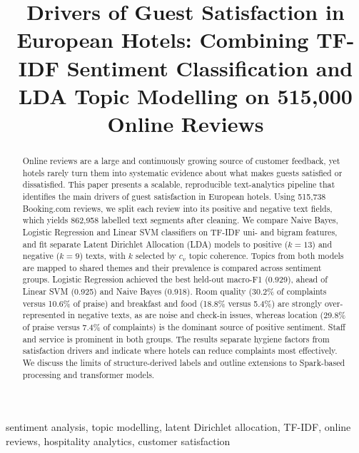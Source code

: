\documentclass[11pt,journal,draftclsnofoot,onecolumn]{IEEEtran}
\begin{document}
\title{Drivers of Guest Satisfaction in European Hotels: Combining TF-IDF Sentiment Classification and LDA Topic Modelling on 515,000 Online Reviews}

\author{
}

\maketitle

\begin{abstract}
Online reviews are a large and continuously growing source of customer feedback, yet hotels rarely turn them into systematic evidence about what makes guests satisfied or dissatisfied. This paper presents a scalable, reproducible text-analytics pipeline that identifies the main drivers of guest satisfaction in European hotels. Using 515,738 Booking.com reviews, we split each review into its positive and negative text fields, which yields 862,958 labelled text segments after cleaning. We compare Naive Bayes, Logistic Regression and Linear SVM classifiers on TF-IDF uni- and bigram features, and fit separate Latent Dirichlet Allocation (LDA) models to positive ($k=13$) and negative ($k=9$) texts, with $k$ selected by $c_v$ topic coherence. Topics from both models are mapped to shared themes and their prevalence is compared across sentiment groups. Logistic Regression achieved the best held-out macro-F1 (0.929), ahead of Linear SVM (0.925) and Naive Bayes (0.918). Room quality (30.2\% of complaints versus 10.6\% of praise) and breakfast and food (18.8\% versus 5.4\%) are strongly over-represented in negative texts, as are noise and check-in issues, whereas location (29.8\% of praise versus 7.4\% of complaints) is the dominant source of positive sentiment. Staff and service is prominent in both groups. The results separate hygiene factors from satisfaction drivers and indicate where hotels can reduce complaints most effectively. We discuss the limits of structure-derived labels and outline extensions to Spark-based processing and transformer models.
\end{abstract}

\begin{IEEEkeywords}
sentiment analysis, topic modelling, latent Dirichlet allocation, TF-IDF, online reviews, hospitality analytics, customer satisfaction
\end{IEEEkeywords}
\end{document}
